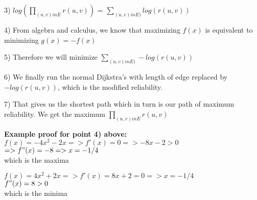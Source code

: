 \documentclass[letterpaper,11pt]{article}
\begin{document}
3) $log( \prod_{(u,v) in E} r(u,v))$  = $\sum_{(u,v) in E)} log(r(u,v))$

4) From algebra and calculus, we know that maximizing $f(x)$ is equivalent to minimizing $g(x) = -f(x)$

5) Therefore we will minimize $\sum_{(u,v) in E)} -log(r(u,v))$

6) We finally run the normal Dijkstra's with length of edge replaced by $ -log(r(u,v))$, which is the modified reliability. 

7) That gives us the shortest path which in turn is our path of maximum reliability. We get the maximum $\prod_{(u,v) in E} r(u,v)$

{\bf Example proof for point 4) above:}\\
$f(x) = -4x^2 -2x => f'(x) = 0 => -8x-2 > 0$ \\
$=> f"(x) = -8 => x=-1/4$ \\
which is the maxima

$f(x) = 4x^2 +2x => f'(x)=8x+2 = 0 => x=-1/4$ \\
$f"(x) = 8 >0$ \\
which is the minima
\end{document}
